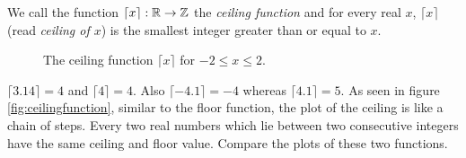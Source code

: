 \documentclass[12pt]{subfile}
\begin{document}
        \begin{definition}
        	We call the function $\lceil x \rceil: \mathbb{R} \to \mathbb Z$ the \textit{ceiling function} and for every real $x$, $\lceil x\rceil$ (read \textit{ceiling of $x$}) is the smallest integer greater than or equal to $x$.
    		
    		\begin{figure}
    			\centering
    			\caption{The ceiling function $\lceil x \rceil$ for $-2 \leq x \leq 2$.}
    			\label{fig:ceilingfunction}
    		\end{figure}
    	\end{definition}
    	
    	\begin{example}
    		$\lceil3.14\rceil=4$ and $\lceil4\rceil=4$. Also $\lceil-4.1\rceil=-4$ whereas $\lceil4.1\rceil=5$. As seen in figure \eqref{fig:ceilingfunction}, similar to the floor function, the plot of the ceiling is like a chain of steps. Every two real numbers which lie between two consecutive integers have the same ceiling and floor value. Compare the plots of these two functions.
    	\end{example}
	
\end{document}

